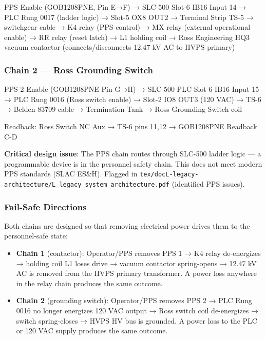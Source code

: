 \begin{sigblock}
PPS Enable (GOB1208PNE, Pin E→F)
    → SLC-500 Slot-6 IB16 Input 14
    → PLC Rung 0017 (ladder logic)
    → Slot-5 OX8 OUT2
    → Terminal Strip TS-5 → switchgear cable
    → K4 relay (PPS control)
    → MX relay (external operational enable)
    → RR relay (reset latch)
    → L1 holding coil
    → Ross Engineering HQ3 vacuum contactor
      (connects/disconnects 12.47 kV AC to HVPS primary)
\end{sigblock}

\subsubsection{Chain 2 --- Ross Grounding Switch}\label{sec:pps-chain2}


\begin{sigblock}
PPS 2 Enable (GOB1208PNE Pin G→H)
    → SLC-500 PLC Slot-6 IB16 Input 15
    → PLC Rung 0016 (Ross switch enable)
    → Slot-2 IO8 OUT3 (120 VAC)
    → TS-6 → Belden 83709 cable → Termination Tank
    → Ross Grounding Switch coil

Readback: Ross Switch NC Aux → TS-6 pins 11,12 → GOB1208PNE Readback C-D
\end{sigblock}

\begin{keynote}
\textbf{Critical design issue}: The PPS chain routes through SLC-500 ladder logic --- a programmable device is in the personnel safety chain. This does not meet modern PPS standards (SLAC ES\&H). Flagged in \texttt{tex/\allowbreak{}docL-\allowbreak{}legacy-\allowbreak{}architecture/\allowbreak{}L\_\allowbreak{}legacy\_\allowbreak{}system\_\allowbreak{}architecture.\allowbreak{}pdf} (identified PPS issues).
\end{keynote}

\subsubsection{Fail-Safe Directions}\label{sec:pps-failsafe}


Both chains are designed so that removing electrical power drives them to the personnel-safe state:

\begin{itemize}
\tightlist
\item
  \textbf{Chain 1} (contactor): Operator/PPS removes PPS 1 → K4 relay de-energizes → holding coil L1 loses drive → vacuum contactor spring-opens → 12.47 kV AC is removed from the HVPS primary transformer. A power loss anywhere in the relay chain produces the same outcome.
\item
  \textbf{Chain 2} (grounding switch): Operator/PPS removes PPS 2 → PLC Rung 0016 no longer energizes 120 VAC output → Ross switch coil de-energizes → switch spring-closes → HVPS HV bus is grounded. A power loss to the PLC or 120 VAC supply produces the same outcome.
\end{itemize}

